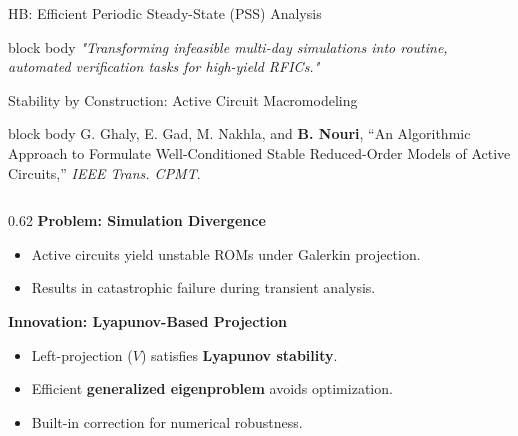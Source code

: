 \begin{frame}[t]{HB: Efficient Periodic Steady-State (PSS) Analysis}
	\vfill
	\begin{beamercolorbox}[wd=\textwidth, sep=1.2ex, center, rounded=true]{block body}
		\small \itshape \textcolor{blue!80!black}{"Transforming infeasible multi-day simulations into routine, automated verification tasks for high-yield RFICs."}
	\end{beamercolorbox}
\end{frame}

\begin{frame}[t]{Stability by Construction: Active Circuit Macromodeling}
	\vspace{1ex}

	\begin{beamercolorbox}[wd=\textwidth, sep=1ex, rounded=true]{block body}
		\scriptsize G. Ghaly, E. Gad, M. Nakhla, and \textbf{B. Nouri}, ``An Algorithmic Approach to Formulate Well-Conditioned Stable Reduced-Order Models of Active Circuits,'' \textit{IEEE Trans. CPMT}.
	\end{beamercolorbox}

	\vspace{2ex}

	\begin{columns}[T, onlytextwidth]
		\begin{column}{0.62\textwidth}
			\small
			\textbf{\textcolor{blue!80!black}{Problem: Simulation Divergence}}
			\begin{itemize}
				\item Active circuits yield unstable ROMs under Galerkin projection.
				\item Results in catastrophic failure during transient analysis.
			\end{itemize}

			\vspace{2ex}
			\textbf{\textcolor{blue!80!black}{Innovation: Lyapunov-Based Projection}}
			\begin{itemize}
				\item Left-projection ($V$) satisfies \textbf{Lyapunov stability}.
				\item Efficient \textbf{generalized eigenproblem} avoids optimization.
				\item Built-in correction for numerical robustness.
			\end{itemize}
		\end{column}


\end{columns}
\end{frame}
